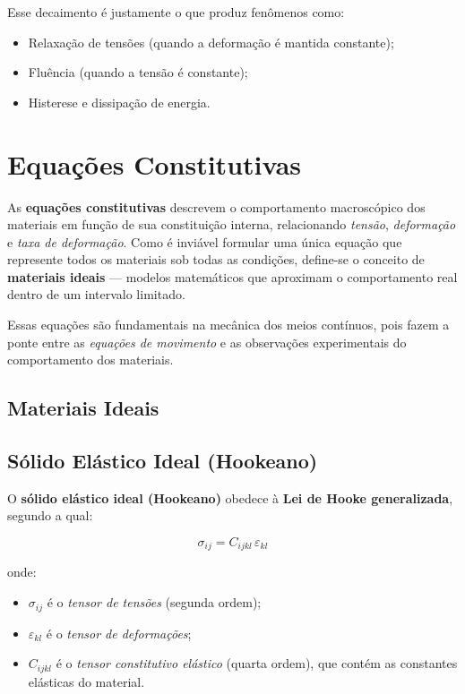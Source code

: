 Esse decaimento é justamente o que produz fenômenos como:
\begin{itemize}
    \item Relaxação de tensões (quando a deformação é mantida constante);
    \item Fluência (quando a tensão é constante);
    \item Histerese e dissipação de energia.
\end{itemize}



\section{ Equações Constitutivas }

As \textbf{equações constitutivas} descrevem o comportamento macroscópico dos materiais em função de sua constituição interna, relacionando \textit{tensão}, \textit{deformação} e \textit{taxa de deformação}.  
Como é inviável formular uma única equação que represente todos os materiais sob todas as condições, define-se o conceito de \textbf{materiais ideais} — modelos matemáticos que aproximam o comportamento real dentro de um intervalo limitado.

Essas equações são fundamentais na mecânica dos meios contínuos, pois fazem a ponte entre as \textit{equações de movimento} e as observações experimentais do comportamento dos materiais.



\subsection{Materiais Ideais}

\subsection{Sólido Elástico Ideal (Hookeano)}

O \textbf{sólido elástico ideal (Hookeano)} obedece à \textbf{Lei de Hooke generalizada}, segundo a qual:

\[
\sigma_{ij} = C_{ijkl}\,\varepsilon_{kl}
\]

onde:
\begin{itemize}
    \item $\sigma_{ij}$ é o \textit{tensor de tensões} (segunda ordem);
    \item $\varepsilon_{kl}$ é o \textit{tensor de deformações};
    \item $C_{ijkl}$ é o \textit{tensor constitutivo elástico} (quarta ordem), que contém as constantes elásticas do material.
\end{itemize}

